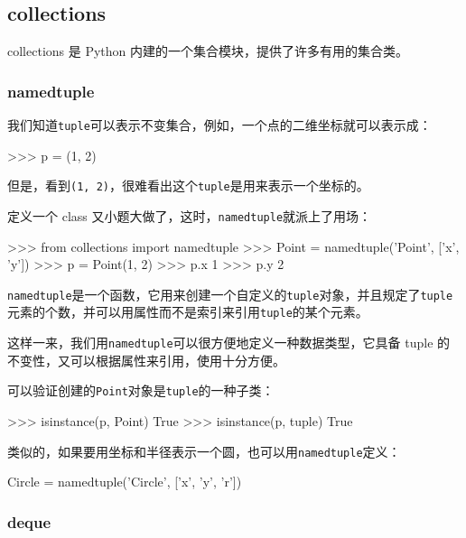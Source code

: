 \hypertarget{collections}{%
\subsection{collections}\label{collections}}

collections 是 Python 内建的一个集合模块，提供了许多有用的集合类。

\hypertarget{namedtuple}{%
\subsubsection{namedtuple}\label{namedtuple}}

我们知道\texttt{tuple}可以表示不变集合，例如，一个点的二维坐标就可以表示成：

\begin{pythoncode}
>>> p = (1, 2)
\end{pythoncode}

但是，看到\texttt{(1,\ 2)}，很难看出这个\texttt{tuple}是用来表示一个坐标的。

定义一个 class 又小题大做了，这时，\texttt{namedtuple}就派上了用场：

\begin{pythoncode}
>>> from collections import namedtuple
>>> Point = namedtuple('Point', ['x', 'y'])
>>> p = Point(1, 2)
>>> p.x
1
>>> p.y
2
\end{pythoncode}

\texttt{namedtuple}是一个函数，它用来创建一个自定义的\texttt{tuple}对象，并且规定了\texttt{tuple}元素的个数，并可以用属性而不是索引来引用\texttt{tuple}的某个元素。

这样一来，我们用\texttt{namedtuple}可以很方便地定义一种数据类型，它具备
tuple 的不变性，又可以根据属性来引用，使用十分方便。

可以验证创建的\texttt{Point}对象是\texttt{tuple}的一种子类：

\begin{pythoncode}
>>> isinstance(p, Point)
True
>>> isinstance(p, tuple)
True
\end{pythoncode}

类似的，如果要用坐标和半径表示一个圆，也可以用\texttt{namedtuple}定义：

\begin{pythoncode}
Circle = namedtuple('Circle', ['x', 'y', 'r'])
\end{pythoncode}

\hypertarget{deque}{%
\subsubsection{deque}\label{deque}}

